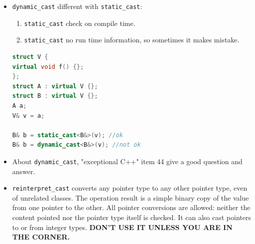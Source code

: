 \documentclass[a4paper,11pt,twoside]{book}
\begin{document}
\begin{itemize}
	\item \texttt{dynamic\_cast} different with \texttt{static\_cast}:
	\begin{enumerate}
		\item \texttt{static\_cast} check on compile time.
		\item \texttt{static\_cast} no run time information, so sometimes it makes mistake.
	\end{enumerate}
\begin{lstlisting}[frame=single, language=c++, mathescape=true]
struct V {
virtual void f() {};
};
struct A : virtual V {};
struct B : virtual V {};
A a;
V& v = a;
	
B& b = static_cast<B&>(v); //ok
B& b = dynamic_cast<B&>(v); //not ok
\end{lstlisting}

	\item About \texttt{dynamic\_cast}, "exceptional C++" item 44 give a good question and answer.
	
	\item \texttt{reinterpret\_cast} converts any pointer type to any other pointer type, even of unrelated classes. The operation result is a simple binary copy of the value from one pointer to the other. All pointer conversions are allowed: neither the content pointed nor the pointer type itself is checked. It can also cast pointers to or from integer types. \textbf{DON'T USE IT UNLESS YOU ARE IN THE CORNER.}
\end{itemize}
\end{document}
